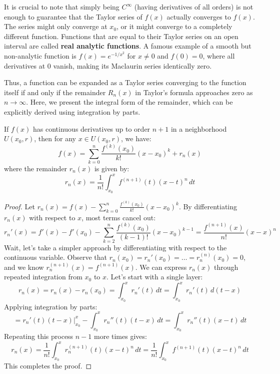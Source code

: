 \begin{remark}[Analyticity]
It is crucial to note that simply being $C^\infty$ (having derivatives of all orders) is not enough to guarantee that the Taylor series of $f(x)$ actually converges to $f(x)$. The series might only converge at $x_0$, or it might converge to a completely different function. Functions that are equal to their Taylor series on an open interval are called \textbf{real analytic functions}. A famous example of a smooth but non-analytic function is $f(x) = e^{-1/x^2}$ for $x \neq 0$ and $f(0) = 0$, where all derivatives at $0$ vanish, making its Maclaurin series identically zero.
\end{remark}

Thus, a function can be expanded as a Taylor series converging to the function itself if and only if the remainder $R_n(x)$ in Taylor's formula approaches zero as $n \to \infty$. Here, we present the integral form of the remainder, which can be explicitly derived using integration by parts.

\begin{theorem}
If $f(x)$ has continuous derivatives up to order $n+1$ in a neighborhood $U(x_0, r)$, then for any $x \in U(x_0, r)$, we have:
\[ f(x) = \sum_{k=0}^{n} \frac{f^{(k)}(x_0)}{k!} (x-x_0)^k + r_n(x) \]
where the remainder $r_n(x)$ is given by:
\[ r_n(x) = \frac{1}{n!} \int_{x_0}^{x} f^{(n+1)}(t) (x-t)^n \, dt \]
\end{theorem}
\begin{proof}
Let $r_n(x) = f(x) - \sum_{k=0}^{n} \frac{f^{(k)}(x_0)}{k!} (x-x_0)^k$. By differentiating $r_n(x)$ with respect to $x$, most terms cancel out:
\[ r_n'(x) = f'(x) - f'(x_0) - \sum_{k=2}^{n} \frac{f^{(k)}(x_0)}{(k-1)!} (x-x_0)^{k-1} = \frac{f^{(n+1)}(x)}{n!} (x-x)^{n} \]
Wait, let's take a simpler approach by differentiating with respect to the continuous variable. Observe that $r_n(x_0) = r_n'(x_0) = \dots = r_n^{(n)}(x_0) = 0$, and we know $r_n^{(n+1)}(x) = f^{(n+1)}(x)$.
We can express $r_n(x)$ through repeated integration from $x_0$ to $x$. Let's start with a single layer:
\[ r_n(x) = r_n(x) - r_n(x_0) = \int_{x_0}^{x} r_n'(t) \, dt = \int_{x_0}^{x} r_n'(t) \, d(t-x) \]
Applying integration by parts:
\[ = r_n'(t)(t-x) \Big|_{x_0}^{x} - \int_{x_0}^{x} r_n''(t)(t-x) \, dt = \int_{x_0}^{x} r_n''(t)(x-t) \, dt \]
Repeating this process $n-1$ more times gives:
\[ r_n(x) = \frac{1}{n!} \int_{x_0}^{x} r_n^{(n+1)}(t) (x-t)^n \, dt = \frac{1}{n!} \int_{x_0}^{x} f^{(n+1)}(t) (x-t)^n \, dt \]
This completes the proof.
\end{proof}

